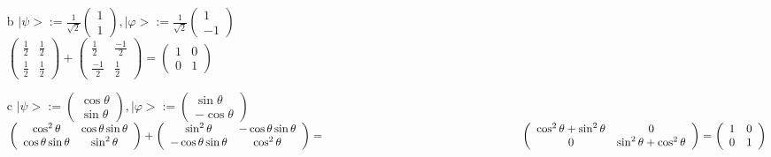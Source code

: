 \documentclass[11 pt]{article}
\theoremstyle{definition}
\theoremstyle{definition}
\def\ket#1{\big|{#1}\big>}
\begin{document}
\begin{enumerate}
\begin{enumerate}
\item[b] $\ket{\psi} := \frac{1}{\sqrt{2}}\left( \begin{array}{c}1\\1\end{array}\right), \ket{\varphi} := \frac{1}{\sqrt{2}}\left( \begin{array}{c}1\\-1\end{array}\right)$\\
\hspace*{1.2cm}$\left( \begin{array}{cc}\frac{1}{2}&\frac{1}{2}\\\frac{1}{2}&\frac{1}{2}\end{array}\right)+\left( \begin{array}{cc}\frac{1}{2}&\frac{-1}{2}\\\frac{-1}{2}&\frac{1}{2}\end{array}\right) = \left( \begin{array}{cc}1&0\\0&1\end{array}\right)$\\
\item[c] $\ket{\psi} := \left( \begin{array}{c}\cos\theta\\\sin\theta\end{array}\right), \ket{\varphi} := \left( \begin{array}{c}\sin\theta\\-\cos\theta\end{array}\right)$\\
\hspace*{1.2cm}$\left( \begin{array}{cc}\cos^2\theta & \cos\theta\sin\theta\\
									\cos\theta\sin\theta & \sin^2\theta\end{array}\right) + 
			   \left( \begin{array}{cc}\sin^2\theta & -\cos\theta\sin\theta\\
									-\cos\theta\sin\theta & \cos^2\theta\end{array}\right) =\\ 
			   \hspace*{6cm}\left( \begin{array}{cc}\cos^2\theta + \sin^2\theta & 0\\
									0 & \sin^2\theta + \cos^2\theta\end{array}\right) = \left( \begin{array}{cc}1&0 \\ 0&1\end{array}\right)  $

\end{enumerate}
\end{enumerate}
\end{document}
